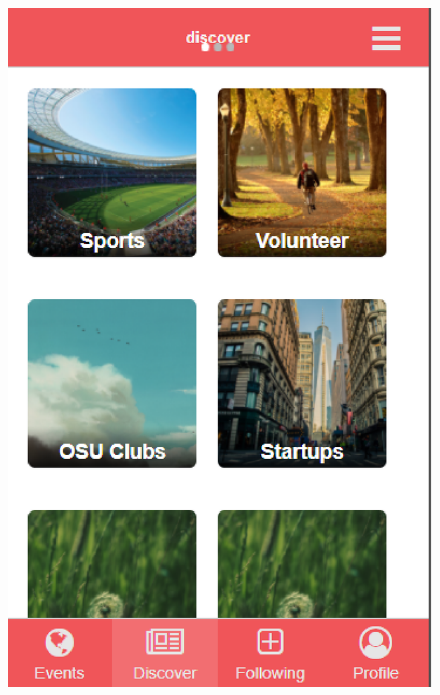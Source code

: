 \documentclass[letterpaper, 10pt,titlepage]{article}
\begin{document}
  \begin{figure}[H]
  \centering
    \includegraphics[scale=0.55]{discover.eps}    
  \end{figure}
\end{document}
